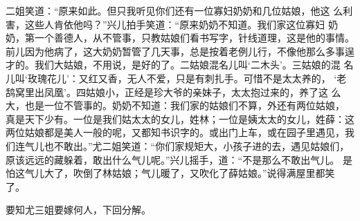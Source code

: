 二姐笑道：“原来如此。但只我听见你们还有一位寡妇奶奶和几位姑娘，他这
么利害，这些人肯依他吗？”兴儿拍手笑道：“原来奶奶不知道。我们家这位寡妇
奶奶，第一个善德人，从不管事，只教姑娘们看书写字，针线道理，这是他的事情。
前儿因为他病了，这大奶奶暂管了几天事，总是按着老例儿行，不像他那么多事逞
才的。我们大姑娘，不用说，是好的了。二姑娘混名儿叫‘二木头’。三姑娘的混
名儿叫‘玫瑰花儿’：又红又香，无人不爱，只是有刺扎手。可惜不是太太养的，
‘老鸹窝里出凤凰’。四姑娘小，正经是珍大爷的亲妹子，太太抱过来的，养了这
么大，也是一位不管事的。奶奶不知道：我们家的姑娘们不算，外还有两位姑娘，
真是天下少有。一位是我们姑太太的女儿，姓林；一位是姨太太的女儿，姓薛：这
两位姑娘都是美人一般的呢，又都知书识字的。或出门上车，或在园子里遇见，我
们连气儿也不敢出。”尤二姐笑道：“你们家规矩大，小孩子进的去，遇见姑娘们，
原该远远的藏躲着，敢出什么气儿呢。”兴儿摇手，道：“不是那么不敢出气儿。
是怕这气儿大了，吹倒了林姑娘；气儿暖了，又吹化了薛姑娘。”说得满屋里都笑
了。

要知尤三姐要嫁何人，下回分解。
